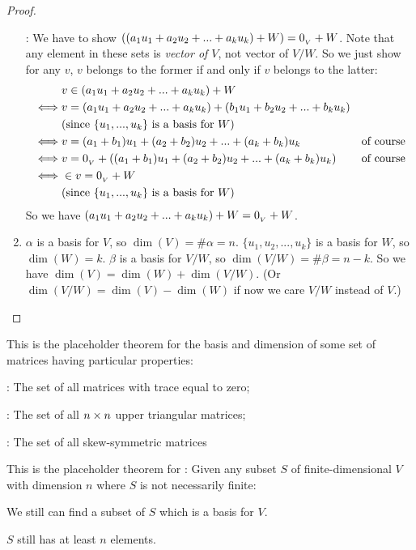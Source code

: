 \begin{proof}
\begin{enumerate}
\RED{(*)}: We have to show \(((a_1 u_1 + a_2 u_2 + ... + a_k u_k) + W) = 0_{_V} + W\).
Note that any element in these sets is \emph{vector of \(V\)}, not vector of \(V/W\).
So we just show for any \(v\), \(v\) belongs to the former if and only if \(v\) belongs to the latter:
\begin{align*}
         & v \in (a_1 u_1 + a_2 u_2 + ... + a_k u_k) + W \\
    \iff & v = (a_1 u_1 + a_2 u_2 + ... + a_k u_k) + (b_1 u_1 + b_2 u_2 + ... + b_k u_k) \\
         & \text{(since \(\{ u_1, ..., u_k \}\) is a basis for \(W\))} \\
    \iff & v = (a_1 + b_1) u_1 + (a_2 + b_2) u_2 + ... + (a_k + b_k) u_k & \text{of course} \\
    \iff & v = 0_{_V} + ((a_1 + b_1) u_1 + (a_2 + b_2) u_2 + ... + (a_k + b_k) u_k) & \text{of course} \\
    \iff & \in v = 0_{_V} + W \\
         & \text{(since \(\{ u_1, ..., u_k \}\) is a basis for \(W\))} \\
\end{align*}
So we have \((a_1 u_1 + a_2 u_2 + ... + a_k u_k) + W = 0_{_V} + W\).

\item
\(\alpha\) is a basis for \(V\), so \(\dim(V) = \#\alpha = n\).
\(\{ u_1, u_2, ..., u_k \}\) is a basis for \(W\), so \(\dim(W) = k\).
\(\beta\) is a basis for \(V/W\), so \(\dim(V/W) = \#\beta = n - k\).
So we have \(\dim(V) = \dim(W) + \dim(V/W)\).
(Or \(\dim(V/W) = \dim(V) - \dim(W)\) if now we care \(V/W\) instead of \(V\).)
\end{enumerate}
\end{proof}

\begin{additional theorem} \label{athm 1.19}
This is the placeholder theorem for the basis and dimension of some set of matrices having particular properties:

 : The set of all matrices with trace equal to zero;

 : The set of all \(n \times n\) upper triangular matrices;

 : The set of all skew-symmetric matrices
\end{additional theorem}

\begin{additional theorem} \label{athm 1.20}
This is the placeholder theorem for : Given any subset \(S\) of finite-dimensional \(V\) with dimension \(n\) where \(S\) is not necessarily finite:

 We still can find a subset of \(S\) which is a basis for \(V\).

 \(S\) still has at least \(n\) elements.
\end{additional theorem}

